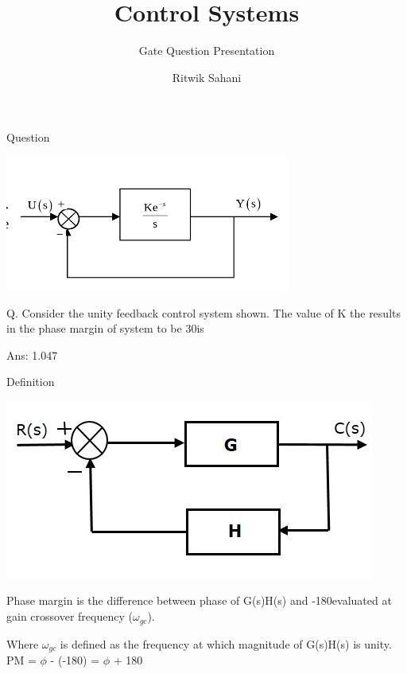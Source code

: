 \documentclass{beamer}
\title[]{Control Systems}
\subtitle{Gate Question Presentation}
\author{Ritwik Sahani}
\institute{IITH}
\begin{document}
\begin{frame}
  \titlepage
\end{frame}

\begin{frame}{Question}
\centerline{\includegraphics[scale=.5 ]{helpme}}
  Q. Consider the unity feedback control system shown. The value of K the results in the phase margin of system to be 30\degree  is 
  
  Ans: 1.047
  
\end{frame}

\begin{frame}{Definition}
\centerline{\includegraphics[scale=.5 ]{negative_feedback}}
Phase margin is the difference between phase of G(s)H(s) and -180\degree evaluated at gain crossover frequency ($\omega_{gc}$).

Where $\omega _{gc}$ is defined as the frequency at which magnitude of G(s)H(s) is unity.
\newline\newline
PM = $\phi$ - (-180\degree)  = $\phi$ + 180\degree
\end{frame}
\end{document}
